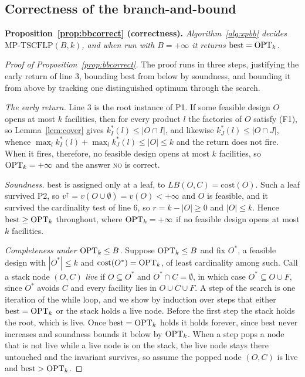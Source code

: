 \subsection{Correctness of the branch-and-bound}\label{app:bb}

\noindent
\textbf{Proposition~\ref{prop:bbcorrect} (correctness).}
\emph{Algorithm~\ref{alg:xpbb} decides $\mathrm{MP\text{-}TSCFLP}(B,k)$, and when
run with $B=+\infty$ it returns $\mathrm{best}=\mathrm{OPT}_k$.}

\begin{proof}[Proof of Proposition~\ref{prop:bbcorrect}]
The proof runs in three steps, justifying the early return of line 3,
bounding $\mathrm{best}$ from below by soundness, and bounding it from
above by tracking one distinguished optimum through the search.

\emph{The early return.} Line 3 is the root instance of P1. If some
feasible design $O$ opens at most $k$ facilities, then for every product
$l$ the factories of $O$ satisfy (F1), so Lemma~\ref{lem:cover} gives
$k^\ast_I(l)\le|O\cap I|$, and likewise $k^\ast_J(l)\le|O\cap J|$, whence
$\max_l k^\ast_I(l)+\max_l k^\ast_J(l)\le|O|\le k$ and the return does
not fire. When it fires, therefore, no feasible design opens at most $k$
facilities, so $\mathrm{OPT}_k=+\infty$ and the answer \textsc{no} is correct.

\emph{Soundness.} $\mathrm{best}$ is assigned only at a leaf, to
$LB(O,C)=\mathrm{cost}(O)$. Such a leaf survived P2, so
$v^{\uparrow}=v(O\cup\emptyset)=v(O)<+\infty$ and $O$ is feasible, and it
survived the cardinality test of line 6, so $r=k-|O|\ge 0$ and
$|O|\le k$. Hence $\mathrm{best}\ge\mathrm{OPT}_k$ throughout, where
$\mathrm{OPT}_k=+\infty$ if no feasible design opens at most $k$ facilities.

\emph{Completeness under $\mathrm{OPT}_k\le B$.} Suppose $\mathrm{OPT}_k\le B$ and fix
$O^\ast$, a feasible design with
$|O^\ast|\le k$ and $\mathrm{cost}(O^\ast)=\mathrm{OPT}_k$, of least cardinality
among such. Call a stack node $(O,C)$ \emph{live} if $O\subseteq O^\ast$
and $O^\ast\cap C=\emptyset$, in which case $O^\ast\subseteq O\cup F$,
since $O^\ast$ avoids $C$ and every facility lies in $O\cup C\cup F$. A
step of the search is one iteration of the while loop, and we show by
induction over steps that either $\mathrm{best}=\mathrm{OPT}_k$ or the stack
holds a live node. Before the first step the stack holds the root, which
is live. Once $\mathrm{best}=\mathrm{OPT}_k$ holds it holds forever, since
$\mathrm{best}$ never increases and soundness bounds it below by
$\mathrm{OPT}_k$. When a step pops a node that is not live while a live node is
on the stack, the live node stays there untouched and the invariant
survives, so assume the popped node $(O,C)$ is live and
$\mathrm{best}>\mathrm{OPT}_k$.


\end{proof}
